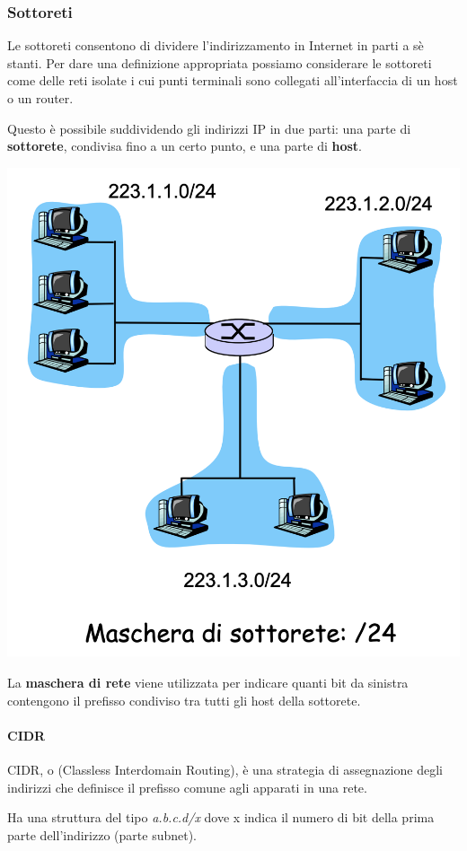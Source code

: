 \documentclass{report}
\begin{document}
\hypertarget{header-n100}{%
\subsubsection{Sottoreti}\label{header-n100}}

Le sottoreti consentono di dividere l'indirizzamento in Internet in
parti a sè stanti. Per dare una definizione appropriata possiamo
considerare le sottoreti come delle reti isolate i cui punti terminali
sono collegati all'interfaccia di un host o un router.

Questo è possibile suddividendo gli indirizzi IP in due parti: una parte
di \textbf{sottorete}, condivisa fino a un certo punto, e una parte di
\textbf{host}.

\begin{center}
		\includegraphics[width=0.7\linewidth]{subnet}
	\end{center}

La \textbf{maschera di rete} viene utilizzata per indicare quanti bit da
sinistra contengono il prefisso condiviso tra tutti gli host della
sottorete.

\hypertarget{header-n105}{%
\paragraph{CIDR}\label{header-n105}}

CIDR, o (Classless Interdomain Routing), è una strategia di assegnazione
degli indirizzi che definisce il prefisso comune agli apparati in una
rete.

Ha una struttura del tipo \emph{a.b.c.d/x} dove x indica il numero di
bit della prima parte dell'indirizzo (parte subnet).
\end{document}
